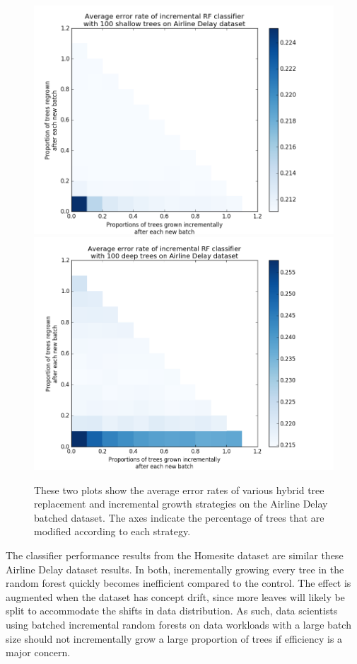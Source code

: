 \begin{figure}
  \centering
  \includegraphics[width=5in]{planeshallow}
  \includegraphics[width=5in]{planedeep}
  \caption{These two plots show the average error rates of various hybrid tree
  replacement and incremental growth strategies on the Airline Delay batched
dataset. The axes indicate the percentage of trees that are modified according
to each strategy.}
  \label{fig:planehybrid}
\end{figure}
 
The classifier performance results from the Homesite dataset are similar these
Airline Delay dataset results. In both, incrementally growing every tree in the
random forest quickly becomes inefficient compared to the control. The effect
is augmented when the dataset has concept drift, since more leaves will likely
be split to accommodate the shifts in data distribution. As such, data
scientists using batched incremental random forests on data workloads with a
large batch size should not incrementally grow a large proportion of trees if
efficiency is a major concern. 

